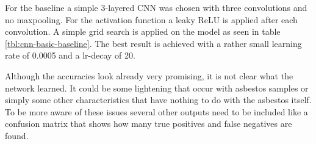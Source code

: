 For the baseline a simple 3-layered CNN was chosen with three convolutions and no maxpooling. For the activation function a leaky ReLU is applied after each convolution. A simple grid search is applied on the model as seen in table \ref{tbl:cnn-basic-baseline}. The best result is achieved with a rather small learning rate of 0.0005 and a lr-decay of 20.

\begin{table*}[t]
    \caption{Accuracy (\%) for several learning rates and lr-decays for CNN\_Basic as a baseline.}
    \centering
    \begin{small}
	\textsc{
	}
    \end{small}
    \vspace{-3.9mm}
    \label{tbl:cnn-basic-baseline}
\end{table*}

Although the accuracies look already very promising, it is not clear what the network learned. It could be some lightening that occur with asbestos samples or simply some other characteristics that have nothing to do with the asbestos itself. To be more aware of these issues several other outputs need to be included like a confusion matrix that shows how many true positives and false negatives are found.

